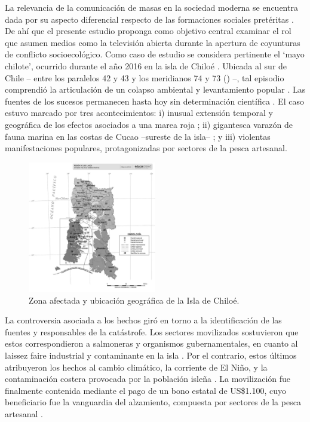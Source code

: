 \documentclass{textolivre}
\begin{document}
La relevancia de la comunicación de masas en la sociedad moderna se encuentra
dada por su aspecto diferencial respecto de las formaciones sociales pretéritas
\cite{Habermas2006}. De ahí que el presente estudio proponga como objetivo central
examinar el rol que asumen medios como la televisión abierta durante la apertura de
coyunturas de conflicto socioecológico. Como caso de estudio se considera pertinente el
‘mayo chilote’, ocurrido durante el año 2016 en la isla de Chiloé \cite{ValdebenitoAllendes2018}.
Ubicada al sur de Chile -- entre los paralelos 42 y 43 y los meridianos 74 y 73 ()
--, tal episodio comprendió la articulación de un colapso ambiental y levantamiento
popular \cite{cabello2018,roman2016}. Las fuentes de los
sucesos permanecen hasta hoy sin determinación científica \cite{buschmann2016,t13b}. 
El caso estuvo marcado por tres acontecimientos: i) inusual extensión
temporal y geográfica de los efectos asociados a una marea roja \cite{burrows2016}; ii)
gigantesca varazón de fauna marina en las costas de Cucao --sureste de la isla-- \cite{cnnchile2016b}; 
y iii) violentas manifestaciones populares, protagonizadas por sectores de
la pesca artesanal.

\begin{figure}[htbp]
 \centering
 \includegraphics[width=0.5\textwidth]{figure001.pdf}
 \caption{Zona afectada y ubicación geográfica de la Isla de Chiloé.}
 \label{fig01}
\end{figure}

La controversia asociada a los hechos giró en torno a la identificación de las
fuentes y responsables de la catástrofe. Los sectores movilizados sostuvieron que estos
correspondieron a salmoneras y organismos gubernamentales, en cuanto al laissez faire
industrial y contaminante en la isla \cite{agenciaefe}. Por el contrario, estos últimos
atribuyeron los hechos al cambio climático, la corriente de El Niño, y la contaminación
costera provocada por la población isleña \cite{infante2016,salmonexpert}. La
movilización fue finalmente contenida mediante el pago de un bono estatal de US\$1.100,
cuyo beneficiario fue la vanguardia del alzamiento, compuesta por sectores de la pesca
artesanal \cite{24horasb}.
\end{document}
